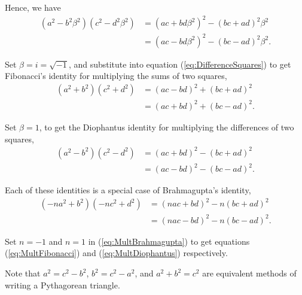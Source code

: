 \documentclass{article}
\theoremstyle{definition}
\begin{document}
Hence, we have
\begin{equation}\begin{aligned}
(a^2-b^2\beta^2) (c^2-d^2\beta^2) &= (ac+bd\beta^2)^2 - (bc+ad)^2\beta^2 \\ &= (ac-bd\beta^2)^2 - (bc-ad)^2\beta^2.
\end{aligned}\label{eq:DifferenceSquares}
\end{equation}

Set \(\beta = i =\sqrt{-1}\), and substitute into equation (\ref{eq:DifferenceSquares}) to get Fibonacci's identity for multiplying the sums of two squares,
\begin{equation}\begin{aligned}
(a^2+b^2) (c^2+d^2) &= (ac-bd)^2 + (bc+ad)^2 \\ &= (ac+bd)^2 + (bc-ad)^2.
\end{aligned}\label{eq:MultFibonacci}
\end{equation}

Set \(\beta=1\), to get the Diophantus identity for multiplying the differences of two squares,
\begin{equation}\begin{aligned}
(a^2-b^2) (c^2-d^2) &= (ac+bd)^2 - (bc+ad)^2 \\ &= (ac-bd)^2 - (bc-ad)^2.
\end{aligned}\label{eq:MultDiophantus}
\end{equation}

Each of these identities is a special case of Brahmagupta's identity,
\begin{equation}\begin{aligned}
(-na^2+b^2) (-nc^2+d^2) &= (nac+bd)^2 - n(bc+ad)^2 \\ &= (nac-bd)^2 - n(bc-ad)^2.
\end{aligned}\label{eq:MultBrahmagupta}
\end{equation}

Set \(n=-1\) and \(n=1\) in (\ref{eq:MultBrahmagupta}) to get equations (\ref{eq:MultFibonacci}) and (\ref{eq:MultDiophantus}) respectively.

Note that \(a^2=c^2-b^2\), \(b^2=c^2-a^2\), and \(a^2+b^2=c^2\) are equivalent methods of writing a Pythagorean triangle.
\end{document}
